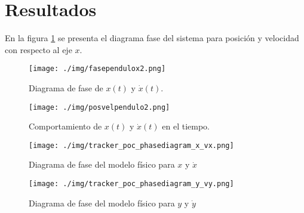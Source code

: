 \section{Resultados}
En la figura \ref{fig: phase plot x} 
se presenta el diagrama fase del sistema para
posición y velocidad con respecto al eje $x$.

\begin{figure}[hb]
 \centering 
 \texttt{[image: ./img/fasependulox2.png]}
\caption{Diagrama de fase de $x(t)$ y $\dot{x}(t)$.}
 \label{fig: phase plot x}
\end{figure}



\begin{figure}[hb]
 \centering 
 \texttt{[image: ./img/posvelpendulo2.png]}
 \caption{Comportamiento de $x(t)$ y $\dot{x}(t)$ en el tiempo.}
 \label{fig: time plot x dx}
\end{figure}


\begin{figure}[h]
 \centering
 \texttt{[image: ./img/tracker\_poc\_phasediagram\_x\_vx.png]}
 \caption{Diagrama de fase del modelo físico para $x$ y $\dot{x}$}
 \label{fig: tracker phase diagram x vx}
\end{figure}

\begin{figure}[h]
 \centering
 \texttt{[image: ./img/tracker\_poc\_phasediagram\_y\_vy.png]}
 \caption{Diagrama de fase del modelo físico para $y$ y $\dot{y}$}
 \label{fig: tracker phase diagram y vy}
\end{figure}
